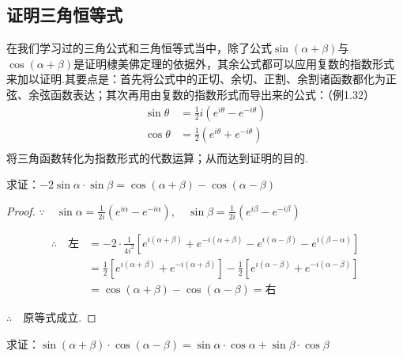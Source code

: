 \subsection{证明三角恒等式}

在我们学习过的三角公式和三角恒等式当中，除了公式$\sin(\alpha+\beta)$与$\cos(\alpha+\beta)$是证明棣美佛定理的依据外，其余公式都可以应用复数的指数形式来加以证明.其要点是：首先将公式中的正切、余切、正割、余割诸函数都化为正弦、余弦函数表达；其次再用由复数的指数形式而导出来的公式：（例1.32）
\[\begin{split}
\sin\theta&=\frac{1}{2}i\left(e^{i\theta}-e^{-i\theta}\right)\\
    \cos\theta&=\frac{1}{2}\left(e^{i\theta}+e^{-i\theta}\right)\\
    \end{split}\]
将三角函数转化为指数形式的代数运算；从而达到证明的目的.

\begin{example}
求证：$-2\sin\alpha\cdot \sin\beta=\cos(\alpha+\beta)-\cos(\alpha-\beta)$    
\end{example}

\begin{proof}
$\because\quad \sin\alpha=\frac{1}{2i}\left(e^{i\alpha}-e^{-i\alpha}\right),\quad \sin\beta=\frac{1}{2i}\left(e^{i\beta}-e^{-i\beta}\right)$

\[\begin{split}
\therefore\quad \text{左}&=-2\cdot \frac{1}{4i^2}\left[e^{i(\alpha+\beta)}+e^{-i(\alpha+\beta)}-e^{i(\alpha-\beta)}-e^{i(\beta-\alpha)}\right]\\
&=\frac{1}{2}\left[e^{i(\alpha+\beta)}+e^{-i(\alpha+\beta)}\right]-\frac{1}{2}\left[e^{i(\alpha-\beta)}+e^{-i(\alpha-\beta)}\right]\\
&=\cos(\alpha+\beta)-\cos(\alpha-\beta)=\text{右}
\end{split}\]

$\therefore\quad $原等式成立.
\end{proof}

\begin{example}
求证：$\sin(\alpha+\beta)\cdot \cos(\alpha-\beta)=\sin\alpha\cdot \cos\alpha+\sin\beta\cdot \cos\beta$
\end{example}

